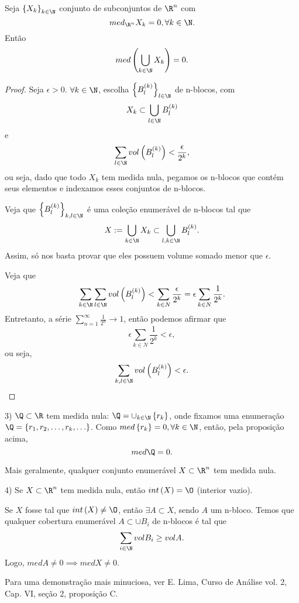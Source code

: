 \begin{prop}
    Seja $\left\{ X_k \right\}_{k\in \N}$ conjunto de subconjuntos de $\R^{n}$ com \[
    med_{\R^{n}}X_k = 0 , \forall k\in \N
    .\] Então \[
    med\left( \bigcup_{k\in \N} X_k \right) = 0
    .\] 
\end{prop}

\begin{proof}
    Seja $\epsilon>0$. $\forall k\in \N$, escolha $\left\{ B_l^{(k)} \right\}_{l\in \N}$ de n-blocos, com \[
    X_k \subset  \bigcup_{l\in \N}B_l^{(k)}
    \]  e \[
    \sum_{l\in \N} vol\left( B_l^{(k)} \right) < \frac{\epsilon}{2^{k}}
    ,\] ou seja, dado que todo $X_k$ tem medida nula, pegamos os n-blocos que contém seus elementos e indexamos esses conjuntos de n-blocos.

    Veja que $\left\{ B_l^{(k)} \right\}_{k,l \in \N}$ é uma coleção enumerável de n-blocos tal que \[
    X:= \bigcup_{k\in \N}X_k \subset \bigcup _{l,k\in \N}B_l^{(k)}
    .\] Assim, só nos basta provar que eles possuem volume somado menor que $\epsilon$.

    Veja que \[
    \sum_{k\in \N} \sum_{l\in \N} vol\left( B_l^{(k)} \right) < \sum_{k\in N} \frac{\epsilon}{2^{k}} = \epsilon\sum_{k\in N} \frac{1}{2^{k}}
.\] Entretanto, a série $\sum_{n=1}^{\infty} \frac{1}{2^{n}} \to 1$, então podemos afirmar que \[
\epsilon\sum_{k\in N} \frac{1}{2^{k}} < \epsilon
,\] ou seja, \[
\sum_{k,l \in  \N} vol\left( B_l^{(k)} \right) < \epsilon
.\] 
\end{proof}

\begin{eg}
    3) $\Q\subset \R$ tem medida nula: $\Q = \cup_{k\in \N}\left\{ r_k \right\} $, onde fixamos uma enumeração $\Q=\left\{ r_1,r_2,\ldots,r_k,\ldots \right\}$. Como $med \left\{ r_k \right\} = 0, \forall k\in \N$, então, pela proposição acima, \[
    med \Q = 0.
    \] 

    Mais geralmente, qualquer conjunto enumerável $X \subset \R^{n}$ tem medida nula.
\end{eg}

\begin{eg}
    4) Se $X \subset  \R^{n}$ tem medida nula, então $int\left( X \right) = \O$ (interior vazio).

    Se $X$ fosse tal que $int\left( X \right) \neq \O$, então $\exists A\subset X$, sendo $A$ um n-bloco. Temos que qualquer cobertura enumerável $A\subset \cup B_i$ de n-blocos é tal que \[
    \sum_{i\in \N} vol B_i \ge vol A
    .\] Logo, $med A \neq 0 \implies med X \neq 0$.

    Para uma demonstração mais minuciosa, ver E. Lima, Curso de Análise vol. 2, Cap. VI, seção 2, proposição C.
\end{eg}

